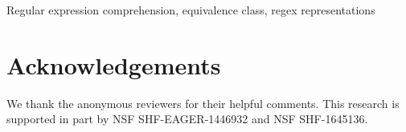 \documentclass[conference]{IEEEtran}
\begin{document}
\begin{abstract}
%

\end{abstract}

\iffalse
\begin{CCSXML}
<ccs2012>
<concept>
<concept_id>10003752.10003766.10003776</concept_id>
<concept_desc>Theory of computation~Regular languages</concept_desc>
<concept_significance>300</concept_significance>
</concept>
<concept>
<concept_id>10011007.10011006.10011072</concept_id>
<concept_desc>Software and its engineering~Software libraries and repositories</concept_desc>
<concept_significance>300</concept_significance>
</concept>
<concept>
<concept_id>10002951.10003260.10003282.10003296</concept_id>
<concept_desc>Information systems~Crowdsourcing</concept_desc>
<concept_significance>300</concept_significance>
</concept>
</ccs2012>
\end{CCSXML}

\ccsdesc[300]{Theory of computation~Regular languages}
\ccsdesc[300]{Software and its engineering~Software libraries and repositories}
\ccsdesc[300]{Information systems~Crowdsourcing}
\fi

\begin{IEEEkeywords}
Regular expression comprehension, equivalence class, regex representations 
\end{IEEEkeywords}




















\balance
\iftrue
\section*{Acknowledgements}
We thank the anonymous reviewers for their helpful comments. %
This research is supported in part by NSF SHF-EAGER-1446932 and NSF SHF-1645136.
\fi



\end{document}
